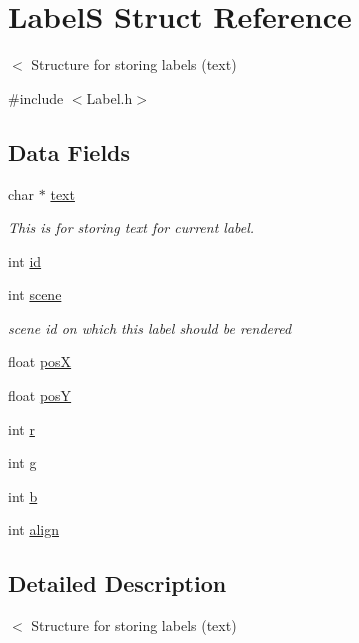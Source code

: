 \hypertarget{struct_label_s}{}\section{LabelS Struct Reference}
\label{struct_label_s}


$<$ Structure for storing labels (text)  




{\ttfamily \#include $<$Label.\+h$>$}

\subsection*{Data Fields}
\begin{DoxyCompactItemize}
\item 
char $\ast$ \hyperlink{struct_label_s_a6065a333c62b5a09d13324f4c876d18c}{text}
\begin{DoxyCompactList}\small\item\em This is for storing text for current label. \end{DoxyCompactList}\item 
int \hyperlink{struct_label_s_a14bef17a433991b2fa46300033771f5e}{id}
\item 
int \hyperlink{struct_label_s_acf66945613bec08104da45a8f82914b3}{scene}
\begin{DoxyCompactList}\small\item\em scene id on which this label should be rendered \end{DoxyCompactList}\item 
float \hyperlink{struct_label_s_abd374e9a8cae5f46bd85c17606dbbcc4}{posX}
\item 
float \hyperlink{struct_label_s_aecee8df1e219856073e5616ed2eed4aa}{posY}
\item 
int \hyperlink{struct_label_s_a3ec33a64903b7195fa8c2b841e3b61ab}{r}
\item 
int \hyperlink{struct_label_s_aa937d6bf5233c68610a5dab7568ec567}{g}
\item 
int \hyperlink{struct_label_s_a48147387bcc95eb2ac7e2077b5f5cb2d}{b}
\item 
int \hyperlink{struct_label_s_a23670dd511cf9261523c08a472e6c448}{align}
\end{DoxyCompactItemize}


\subsection{Detailed Description}
$<$ Structure for storing labels (text) 


